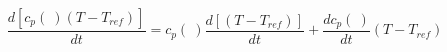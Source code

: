 \begin{equation}
\frac{d [c_p(\ ) (T-T_{ref})]}{dt} =c_p(\ ) \frac{d [ (T- T_{ref})]}{dt} + \frac{d c_p(\ )}{dt} (T- T_{ref})
\end{equation}
